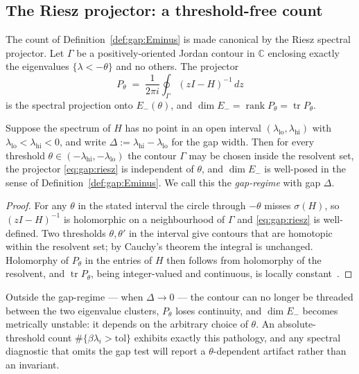 \subsection{The Riesz projector: a threshold-free count}
\label{sec:gap:riesz}

The count of Definition~\ref{def:gap:Eminus} is made canonical by the Riesz
spectral projector. Let $\Gamma$ be a positively-oriented Jordan contour in
$\mathbb{C}$ enclosing exactly the eigenvalues $\{\lambda<-\theta\}$ and no
others. The projector
\begin{equation}
  P_\theta \;=\; \frac{1}{2\pi i} \oint_\Gamma (zI-H)^{-1}\, dz
  \label{eq:gap:riesz}
\end{equation}
is the spectral projection onto $E_-(\theta)$, and
$\dim E_- = \operatorname{rank} P_\theta = \operatorname{tr} P_\theta$.

\begin{proposition}
\label{prop:gap:wellposed}
Suppose the spectrum of $H$ has no point in an open interval
$(\lambda_{\mathrm{lo}},\lambda_{\mathrm{hi}})$ with
$\lambda_{\mathrm{lo}}<\lambda_{\mathrm{hi}}<0$, and write
$\Delta := \lambda_{\mathrm{hi}}-\lambda_{\mathrm{lo}}$ for the gap width.
Then for every threshold
$\theta \in (-\lambda_{\mathrm{hi}},-\lambda_{\mathrm{lo}})$ the contour
$\Gamma$ may be chosen inside the resolvent set, the projector
\eqref{eq:gap:riesz} is independent of $\theta$, and $\dim E_-$ is
well-posed in the sense of Definition~\ref{def:gap:Eminus}. We call this the
\emph{gap-regime} with gap $\Delta$.
\end{proposition}

\begin{proof}
For any $\theta$ in the stated interval the circle through $-\theta$ misses
$\sigma(H)$, so $(zI-H)^{-1}$ is holomorphic on a neighbourhood of $\Gamma$
and \eqref{eq:gap:riesz} is well-defined. Two thresholds
$\theta,\theta'$ in the interval give contours that are homotopic within the
resolvent set; by Cauchy's theorem the integral is unchanged. Holomorphy of
$P_\theta$ in the entries of $H$ then follows from holomorphy of the
resolvent, and $\operatorname{tr}P_\theta$, being integer-valued and
continuous, is locally constant~\cite{kato1995perturbation}.
\end{proof}

Outside the gap-regime --- when $\Delta\to 0$ --- the contour can no longer be
threaded between the two eigenvalue clusters, $P_\theta$ loses continuity, and
$\dim E_-$ becomes metrically unstable: it depends on the arbitrary choice of
$\theta$. An absolute-threshold count $\#\{\beta\lambda_i>\mathrm{tol}\}$
exhibits exactly this pathology, and any spectral diagnostic that omits the
gap test will report a $\theta$-dependent artifact rather than an invariant.


